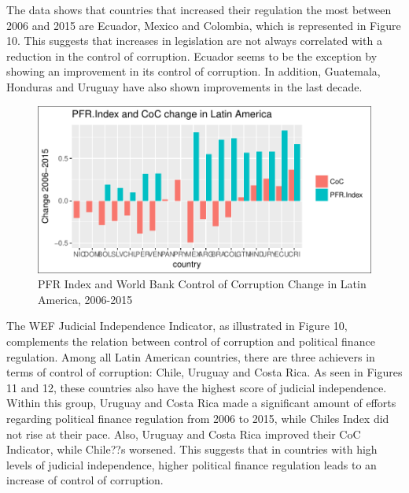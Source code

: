 \documentclass[12,twoside]{article}
\begin{document}
The data shows that countries that increased their regulation the most
between 2006 and 2015 are Ecuador, Mexico and Colombia, which is
represented in Figure 10. This suggests that increases in legislation
are not always correlated with a reduction in the control of corruption.
Ecuador seems to be the exception by showing an improvement in its
control of corruption. In addition, Guatemala, Honduras and Uruguay have
also shown improvements in the last decade. \pagebreak

\begin{figure}[h]

{\centering \includegraphics{thesis_body_files/figure-latex/figure_x-1} 

}

\caption{PFR Index and World Bank Control of Corruption Change in Latin America, 2006-2015}\label{fig:figure_x}
\end{figure}

The WEF Judicial Independence Indicator, as illustrated in Figure 10,
complements the relation between control of corruption and political
finance regulation. Among all Latin American countries, there are three
achievers in terms of control of corruption: Chile, Uruguay and Costa
Rica. As seen in Figures 11 and 12, these countries also have the
highest score of judicial independence. Within this group, Uruguay and
Costa Rica made a significant amount of efforts regarding political
finance regulation from 2006 to 2015, while Chiles Index did not rise at
their pace. Also, Uruguay and Costa Rica improved their CoC Indicator,
while Chile??s worsened. This suggests that in countries with high
levels of judicial independence, higher political finance regulation
leads to an increase of control of corruption.\\
\pagebreak
\end{document}
